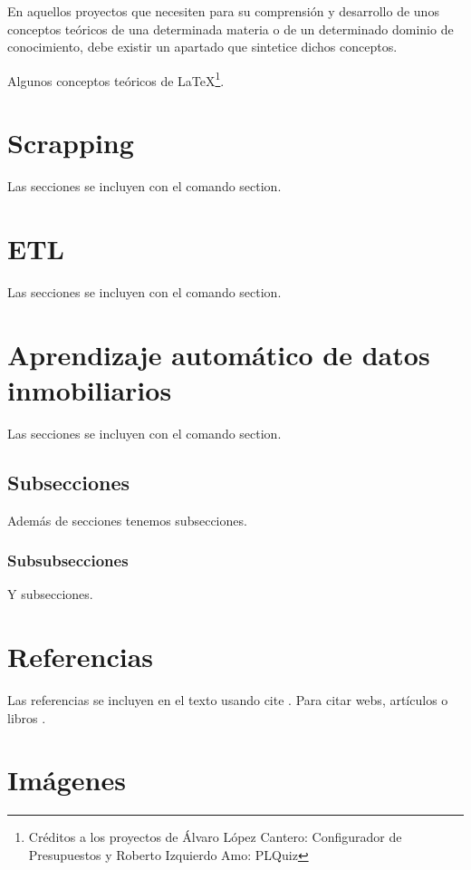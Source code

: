 
En aquellos proyectos que necesiten para su comprensión y desarrollo de unos conceptos teóricos de una determinada materia o de un determinado dominio de conocimiento, debe existir un apartado que sintetice dichos conceptos.

Algunos conceptos teóricos de \LaTeX \footnote{Créditos a los proyectos de Álvaro López Cantero: Configurador de Presupuestos y Roberto Izquierdo Amo: PLQuiz}.

\section{Scrapping}

Las secciones se incluyen con el comando section.

\section{ETL}

Las secciones se incluyen con el comando section.

\section{Aprendizaje automático de datos inmobiliarios}

Las secciones se incluyen con el comando section.

\subsection{Subsecciones}

Además de secciones tenemos subsecciones.

\subsubsection{Subsubsecciones}

Y subsecciones. 


\section{Referencias}

Las referencias se incluyen en el texto usando cite \cite{wiki:latex}. Para citar webs, artículos o libros \cite{koza92}.


\section{Imágenes}

